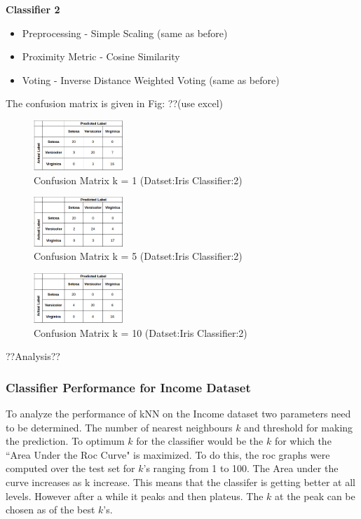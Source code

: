 	\textbf{Classifier 2}\\
	\begin{itemize}
		\item Preprocessing - Simple Scaling (same as before)
		\item Proximity Metric - Cosine Similarity
		\item Voting - Inverse Distance Weighted Voting (same as before)
	\end{itemize}
	The confusion matrix is given in Fig: ??(use excel)
	\begin{figure}[h]
			\label{fig:iris_cosine_k=1}
			\caption{Confusion Matrix k = 1 (Datset:Iris Classifier:2)}
			\centering
			\includegraphics[width=0.3\textwidth]{images/iris_cosine_k=1.png}
	\end{figure}
	\begin{figure}[h]
		\label{fig:iris_consine_k=5}
		\caption{Confusion Matrix k = 5 (Datset:Iris Classifier:2)}
		\centering
		\includegraphics[width=0.3\textwidth]{images/iris_cosine_k=5.png}
	\end{figure}
	\begin{figure}[h]
		\label{fig:iris_cosine_k=10}
		\caption{Confusion Matrix k = 10 (Datset:Iris Classifier:2)}
		\centering
		\includegraphics[width=0.3\textwidth]{images/iris_cosine_k=10.png}
	\end{figure}
	??Analysis??

\subsubsection{Classifier Performance for Income Dataset}
To analyze the performance of kNN on the Income dataset two parameters need to be determined. The number of nearest neighbours $k$ and threshold for making the prediction. To optimum $k$ for the classifier would be the $k$ for which the ``Area Under the Roc Curve" is maximized. To do this, the roc graphs were computed over the test set for $k$'s ranging from 1 to 100. The Area under the curve increases as k increase. This means that the classifer is getting better at all levels. However after a while it peaks and then plateus. The $k$ at the peak can be chosen as of the best $k$'s.


